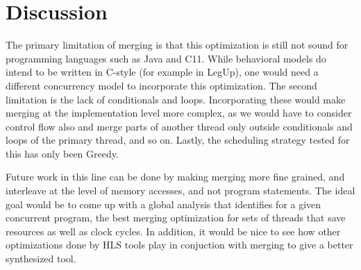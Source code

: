 \section{Discussion}

    The primary limitation of merging is that this optimization is still not sound for programming languages such as Java and C11. 
    While behavioral models do intend to be written in C-style (for example in LegUp), one would need a different concurrency model to incorporate this optimization.
    The second limitation is the lack of conditionals and loops.
    Incorporating these would make merging at the implementation level more complex, as we would have to consider control flow also and merge parts of another thread only outside conditionals and loops of the primary thread, and so on. 
    Lastly, the scheduling strategy tested for this has only been Greedy.

    Future work in this line can be done by making merging more fine grained, and interleave at the level of memory accesses, and not program statements. 
    The ideal goal would be to come up with a global analysis that identifies for a given concurrent program, the best merging optimization for sets of threads that save resources as well as clock cycles.
    In addition, it would be nice to see how other optimizations done by HLS tools play in conjuction with merging to give a better synthesized tool. 
